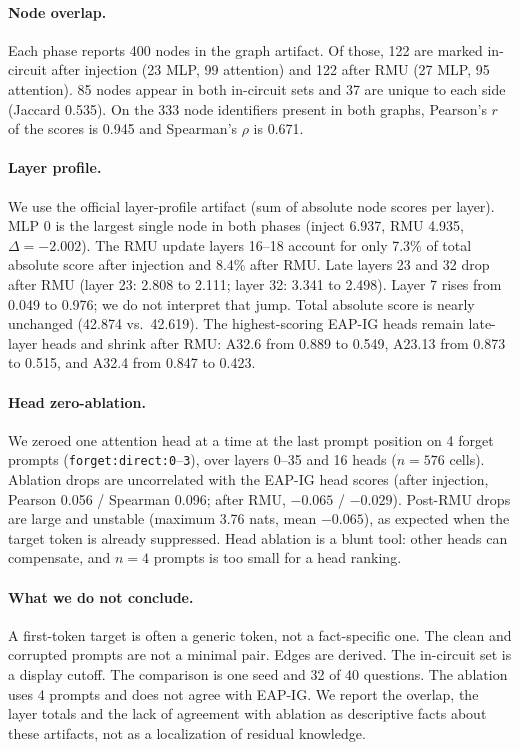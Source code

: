 \documentclass[10pt,twocolumn]{article}
\newcommand{\code}[1]{\texttt{#1}}
\begin{document}
\paragraph{Node overlap.} Each phase reports 400 nodes in the graph artifact. Of those, 122 are marked in-circuit after injection (23 MLP, 99 attention) and 122 after RMU (27 MLP, 95 attention). 85 nodes appear in both in-circuit sets and 37 are unique to each side (Jaccard 0.535). On the 333 node identifiers present in both graphs, Pearson's $r$ of the scores is 0.945 and Spearman's $\rho$ is 0.671.

\paragraph{Layer profile.} We use the official layer-profile artifact (sum of absolute node scores per layer). MLP 0 is the largest single node in both phases (inject 6.937, RMU 4.935, $\Delta=-2.002$). The RMU update layers 16--18 account for only 7.3\% of total absolute score after injection and 8.4\% after RMU. Late layers 23 and 32 drop after RMU (layer 23: 2.808 to 2.111; layer 32: 3.341 to 2.498). Layer 7 rises from 0.049 to 0.976; we do not interpret that jump. Total absolute score is nearly unchanged (42.874 vs.\ 42.619). The highest-scoring EAP-IG heads remain late-layer heads and shrink after RMU: A32.6 from 0.889 to 0.549, A23.13 from 0.873 to 0.515, and A32.4 from 0.847 to 0.423.

\paragraph{Head zero-ablation.} We zeroed one attention head at a time at the last prompt position on 4 forget prompts (\code{forget:direct:0}--\code{3}), over layers 0--35 and 16 heads ($n=576$ cells). Ablation drops are uncorrelated with the EAP-IG head scores (after injection, Pearson 0.056 / Spearman 0.096; after RMU, $-0.065$ / $-0.029$). Post-RMU drops are large and unstable (maximum 3.76 nats, mean $-0.065$), as expected when the target token is already suppressed. Head ablation is a blunt tool: other heads can compensate, and $n=4$ prompts is too small for a head ranking.

\paragraph{What we do not conclude.} A first-token target is often a generic token, not a fact-specific one. The clean and corrupted prompts are not a minimal pair. Edges are derived. The in-circuit set is a display cutoff. The comparison is one seed and 32 of 40 questions. The ablation uses 4 prompts and does not agree with EAP-IG. We report the overlap, the layer totals and the lack of agreement with ablation as descriptive facts about these artifacts, not as a localization of residual knowledge.
\end{document}
